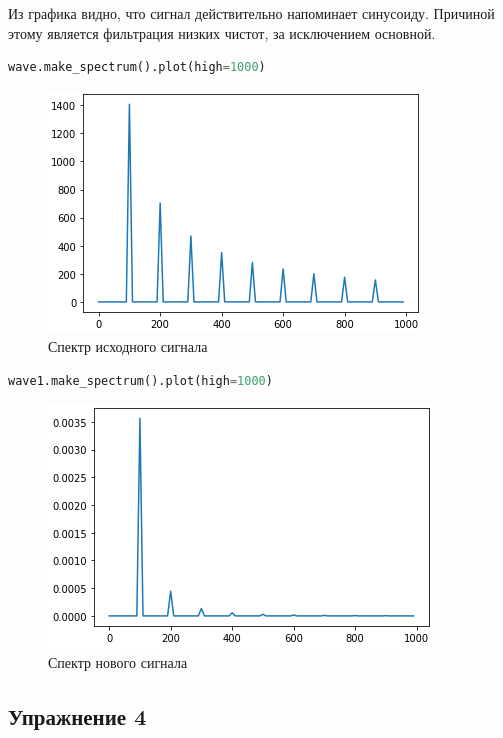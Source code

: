 Из графика видно, что сигнал действительно напоминает синусоиду. Причиной этому является фильтрация низких чистот, за исключением основной.

\begin{lstlisting}[language=Python]
wave.make_spectrum().plot(high=1000)
\end{lstlisting}
\begin{figure}[H]
	\begin{center}
		\includegraphics[scale=1]{fig/lab09/lab9_10.png}
		\caption{Спектр исходного сигнала}
	\end{center}
\end{figure}

\begin{lstlisting}[language=Python]
wave1.make_spectrum().plot(high=1000)
\end{lstlisting}
\begin{figure}[H]
	\begin{center}
		\includegraphics[scale=1]{fig/lab09/lab9_11.png}
		\caption{Спектр нового сигнала}
	\end{center}
\end{figure}


\subsection{Упражнение 4}

